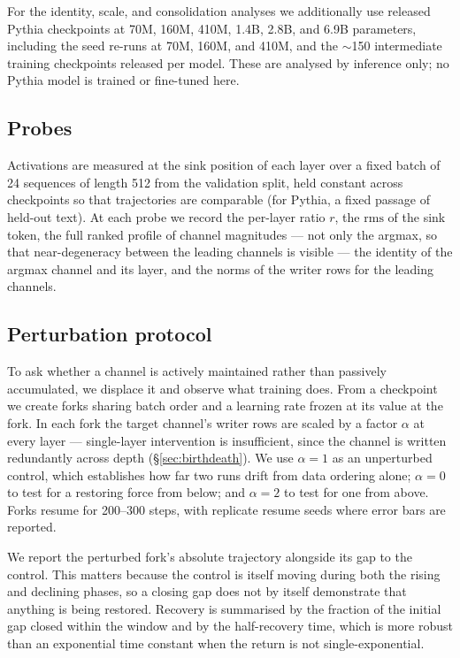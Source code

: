 \documentclass[11pt]{article}
\newcommand{\rms}{\mathrm{rms}}
\begin{document}
For the identity, scale, and consolidation analyses we additionally use released
Pythia checkpoints \citep{biderman2023pythia} at 70M, 160M, 410M, 1.4B, 2.8B, and
6.9B parameters, including the seed re-runs at 70M, 160M, and 410M, and the
$\sim$150 intermediate training checkpoints released per model. These are analysed
by inference only; no Pythia model is trained or fine-tuned here.

\subsection{Probes}

Activations are measured at the sink position of each layer over a fixed batch of 24
sequences of length 512 from the validation split, held constant across checkpoints
so that trajectories are comparable (for Pythia, a fixed passage of held-out text).
At each probe we record the per-layer ratio $r$, the $\rms$ of the sink token, the
full ranked profile of channel magnitudes --- not only the argmax, so that
near-degeneracy between the leading channels is visible --- the identity of the
argmax channel and its layer, and the norms of the writer rows for the leading
channels.

\subsection{Perturbation protocol}

To ask whether a channel is actively maintained rather than passively accumulated,
we displace it and observe what training does. From a checkpoint we create forks
sharing batch order and a learning rate frozen at its value at the fork. In each
fork the target channel's writer rows are scaled by a factor $\alpha$ at every layer
--- single-layer intervention is insufficient, since the channel is written
redundantly across depth (\S\ref{sec:birthdeath}). We use $\alpha = 1$ as an
unperturbed control, which establishes how far two runs drift from data ordering
alone; $\alpha = 0$ to test for a restoring force from below; and $\alpha = 2$ to
test for one from above. Forks resume for 200--300 steps, with replicate resume
seeds where error bars are reported.

We report the perturbed fork's absolute trajectory alongside its gap to the control.
This matters because the control is itself moving during both the rising and
declining phases, so a closing gap does not by itself demonstrate that anything is
being restored. Recovery is summarised by the fraction of the initial gap closed
within the window and by the half-recovery time, which is more robust than an
exponential time constant when the return is not single-exponential.
\end{document}
